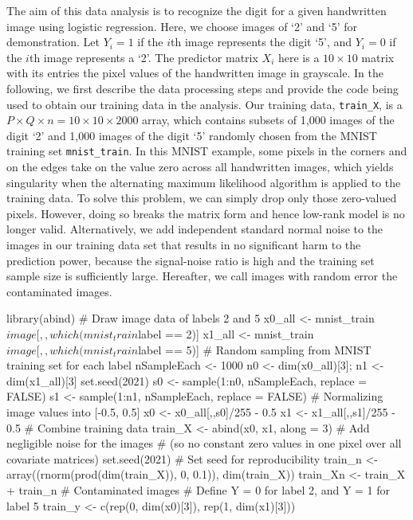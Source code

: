 The aim of this data analysis is to recognize the digit for a given
handwritten image using logistic regression. Here, we choose images of
`2' and `5' for demonstration. Let \(Y_i = 1\) if the \(i\)th image
represents the digit `5', and \(Y_i = 0\) if the \(i\)th image
represents a `2'. The predictor matrix \(X_i\) here is a
\(10 \times 10\) matrix with its entries the pixel values of the
handwritten image in grayscale. In the following, we first describe the
data processing steps and provide the code being used to obtain our
training data in the analysis. Our training data, \texttt{train\_X}, is
a \(P \times Q \times n = 10 \times 10 \times 2000\) array, which
contains subsets of 1,000 images of the digit `2' and 1,000 images of
the digit `5' randomly chosen from the MNIST training set
\texttt{mnist\_train}. In this MNIST example, some pixels in the corners
and on the edges take on the value zero across all handwritten images,
which yields singularity when the alternating maximum likelihood
algorithm is applied to the training data. To solve this problem, we can
simply drop only those zero-valued pixels. However, doing so breaks the
matrix form and hence low-rank model is no longer valid. Alternatively,
we add independent standard normal noise to the images in our training
data set that results in no significant harm to the prediction power,
because the signal-noise ratio is high and the training set sample size
is sufficiently large. Hereafter, we call images with random error the
contaminated images.

\begin{Schunk}
\begin{Sinput}
library(abind)
# Draw image data of labels 2 and 5
x0_all <- mnist_train$image[,,which(mnist_train$label == 2)]
x1_all <- mnist_train$image[,,which(mnist_train$label == 5)]
# Random sampling from MNIST training set for each label
nSampleEach <- 1000
n0 <- dim(x0_all)[3]; n1 <- dim(x1_all)[3]
set.seed(2021)
s0 <- sample(1:n0, nSampleEach, replace = FALSE)  
s1 <- sample(1:n1, nSampleEach, replace = FALSE)  
# Normalizing image values into [-0.5, 0.5]
x0 <- x0_all[,,s0]/255 - 0.5
x1 <- x1_all[,,s1]/255 - 0.5
# Combine training data
train_X <- abind(x0, x1, along = 3)
# Add negligible noise for the images 
# (so no constant zero values in one pixel over all covariate matrices)
set.seed(2021) # Set seed for reproducibility
train_n <- array((rnorm(prod(dim(train_X)), 0, 0.1)), dim(train_X))
train_Xn <- train_X + train_n # Contaminated images
# Define Y = 0 for label 2, and Y = 1 for label 5
train_y <- c(rep(0, dim(x0)[3]), rep(1, dim(x1)[3]))
\end{Sinput}
\end{Schunk}

